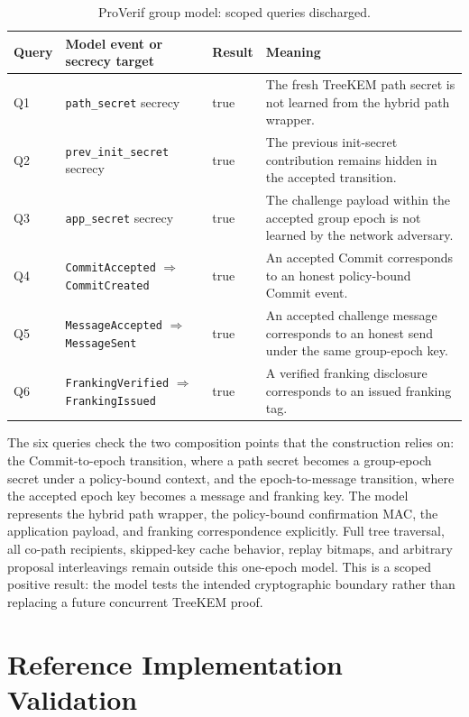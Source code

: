 \documentclass[preprint,12pt]{elsarticle}
\theoremstyle{definition}
\newcommand{\tech}[1]{\textnormal{#1}}
\newcommand{\ProVerif}{\tech{ProVerif}}
\begin{document}
\begin{table}[tbp]
\centering
\caption{\ProVerif{} group model: scoped queries discharged.}\label{tab:group-proverif}
\small
\begin{tabularx}{\textwidth}{@{}p{}p{}p{}Y@{}}
\toprule
Query & Model event or secrecy target & Result & Meaning \\
\midrule
Q1 & \texttt{path\_secret} secrecy & true & The fresh TreeKEM path secret is not learned from the hybrid path wrapper. \\
Q2 & \texttt{prev\_init\_secret} secrecy & true & The previous init-secret contribution remains hidden in the accepted transition. \\
Q3 & \texttt{app\_secret} secrecy & true & The challenge payload within the accepted group epoch is not learned by the network adversary. \\
Q4 & \texttt{CommitAccepted} $\Rightarrow$ \texttt{CommitCreated} & true & An accepted Commit corresponds to an honest policy-bound Commit event. \\
Q5 & \texttt{MessageAccepted} $\Rightarrow$ \texttt{MessageSent} & true & An accepted challenge message corresponds to an honest send under the same group-epoch key. \\
Q6 & \texttt{FrankingVerified} $\Rightarrow$ \texttt{FrankingIssued} & true & A verified franking disclosure corresponds to an issued franking tag. \\
\bottomrule
\end{tabularx}
\end{table}

The six queries check the two composition points that the construction relies on:
the Commit-to-epoch transition, where a path secret becomes a group-epoch
secret under a policy-bound context, and the epoch-to-message transition,
where the accepted epoch key becomes a message and franking key. The model
represents the hybrid path wrapper, the policy-bound confirmation MAC, the
application payload, and franking correspondence explicitly. Full tree
traversal, all co-path recipients, skipped-key cache behavior, replay bitmaps,
and arbitrary proposal interleavings remain outside this one-epoch model.
This is a scoped positive result: the model tests the intended cryptographic
boundary rather than replacing a future concurrent TreeKEM proof.

\section{Reference Implementation Validation}
\end{document}
